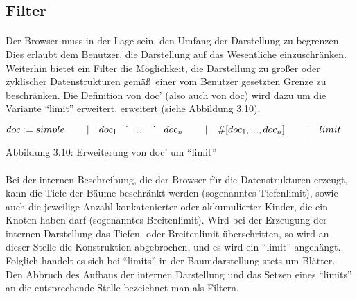 \documentclass[12pt,a4paper]{article}
\begin{document}
\subsection{Filter}

\paragraph{}

Der Browser muss in der Lage sein, den Umfang  der Darstellung zu begrenzen. 
Dies erlaubt dem Benutzer, die Darstellung auf das Wesentliche 
einzuschr\"anken. Weiterhin bietet ein Filter die M\"oglichkeit, 
die Darstellung zu gro\ss er oder zyklischer Datenstrukturen 
gem\"a\ss \, einer vom Benutzer gesetzten Grenze zu beschr\"anken. 
Die Definition von doc' (also auch von doc) wird dazu um die 
Variante ``limit'' erweitert.
erweitert (siehe Abbildung 3.10). \\[1mm]

\begin{minipage}{15cm}
\begin{math}
doc :=  simple \newline
\hspace*{8mm} | \quad  doc_{1} \quad \hat{} \quad ... \quad \hat{} 
                \quad  doc_{n} \newline   
\hspace*{8mm} | \quad  
\# \lbrack doc_{1}, ... , doc_{n}\rbrack \newline
\hspace*{8mm} | \quad limit 
\end{math} \newline
\end{minipage}
Abbildung 3.10: Erweiterung von doc' um ``limit''

\paragraph{}

Bei der internen Beschreibung, die der Browser f\"ur die 
Datenstrukturen erzeugt, kann die Tiefe der B\"aume beschr\"ankt werden 
(sogenanntes Tiefenlimit), sowie auch die jeweilige 
Anzahl konkatenierter oder akkumulierter Kinder, die ein Knoten haben 
darf (sogenanntes Breitenlimit). Wird bei der Erzeugung der internen 
Darstellung das Tiefen- oder Breitenlimit \"uberschritten, so wird an 
dieser Stelle die Konstruktion abgebrochen, und es wird ein ``limit'' 
angeh\"angt. Folglich handelt es sich bei ``limits'' in der Baumdarstellung 
stets um Bl\"atter. Den Abbruch des Aufbaus der internen Darstellung und 
das Setzen eines ``limits'' an die entsprechende Stelle bezeichnet man 
als Filtern. 
\end{document}
